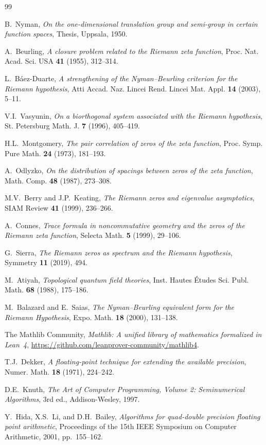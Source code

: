 \begin{thebibliography}{99}

B.~Nyman, \emph{On the one-dimensional translation group and semi-group in
certain function spaces}, Thesis, Uppsala, 1950.

A.~Beurling, \emph{A closure problem related to the Riemann zeta function},
Proc. Nat. Acad. Sci. USA \textbf{41} (1955), 312--314.

L.~B\'aez-Duarte, \emph{A strengthening of the Nyman--Beurling criterion for
the Riemann hypothesis}, Atti Accad. Naz. Lincei Rend. Lincei Mat. Appl.
\textbf{14} (2003), 5--11.

V.I.~Vasyunin, \emph{On a biorthogonal system associated with the Riemann
hypothesis}, St. Petersburg Math. J. \textbf{7} (1996), 405--419.

H.L.~Montgomery, \emph{The pair correlation of zeros of the zeta function},
Proc. Symp. Pure Math. \textbf{24} (1973), 181--193.

A.~Odlyzko, \emph{On the distribution of spacings between zeros of the zeta
function}, Math. Comp. \textbf{48} (1987), 273--308.

M.V.~Berry and J.P.~Keating, \emph{The Riemann zeros and eigenvalue
asymptotics}, SIAM Review \textbf{41} (1999), 236--266.

A.~Connes, \emph{Trace formula in noncommutative geometry and the zeros of
the Riemann zeta function}, Selecta Math. \textbf{5} (1999), 29--106.

G.~Sierra, \emph{The Riemann zeros as spectrum and the Riemann hypothesis},
Symmetry \textbf{11} (2019), 494.

M.~Atiyah, \emph{Topological quantum field theories}, Inst. Hautes \'Etudes
Sci. Publ. Math. \textbf{68} (1988), 175--186.

M.~Balazard and E.~Saias, \emph{The Nyman--Beurling equivalent form for the
Riemann Hypothesis}, Expo. Math. \textbf{18} (2000), 131--138.

The Mathlib Community, \emph{Mathlib: A unified library of mathematics
formalized in Lean~4}, \url{https://github.com/leanprover-community/mathlib4}.

T.J.~Dekker, \emph{A floating-point technique for extending the available
precision}, Numer. Math. \textbf{18} (1971), 224--242.

D.E.~Knuth, \emph{The Art of Computer Programming, Volume 2: Seminumerical
Algorithms}, 3rd ed., Addison-Wesley, 1997.

Y.~Hida, X.S.~Li, and D.H.~Bailey, \emph{Algorithms for quad-double precision
floating point arithmetic}, Proceedings of the 15th IEEE Symposium on
Computer Arithmetic, 2001, pp.~155--162.

\end{thebibliography}
